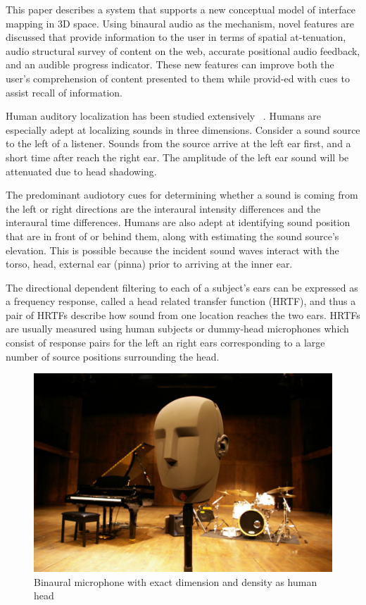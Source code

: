 This paper describes a system that supports a new conceptual model of interface
mapping in 3D space. Using binaural audio as the mechanism, novel features are
discussed that provide information to the user in terms of spatial at-tenuation,
audio structural survey of content on the web, accurate positional audio
feedback, and an audible progress indicator.  These new features can improve
both the user’s comprehension of content presented to them while provid-ed with
cues to assist recall of information.


Human auditory localization has been studied extensively ~\cite{
yost1987directional, blauert1997spatial}. Humans are especially adept at
localizing sounds in three dimensions. Consider a sound source to the left of a
listener.  Sounds from the source arrive at the left ear first, and a short time
after reach the right ear.  The amplitude of the left ear sound will be
attenuated due to head shadowing.


The predominant audiotory cues for determining whether a sound is coming from
the left or right directions are the  interaural intensity differences and the
interaural time differences. Humans are also adept at identifying sound position
that are in front of or behind them, along with estimating the sound source's
elevation.  This is possible because the incident sound waves interact with the
torso, head, external ear (pinna) prior to arriving at the inner ear.


The directional dependent filtering to each of a subject's ears can be expressed
as a frequency response, called a head related transfer function (HRTF), and
thus a pair of HRTFs describe how sound from one location reaches the two ears.
HRTFs are usually measured using human subjects or dummy-head microphones which
consist of response pairs for the left an right ears corresponding to a large
number of source positions surrounding the head.


\begin{figure}[h!]
  \centering
  \includegraphics[width=1\textwidth]{images/binaural_mic.png}
  \caption{Binaural microphone with exact dimension and density as human head}
\end{figure}


